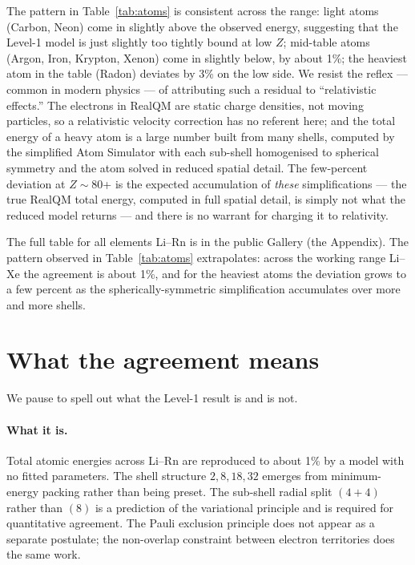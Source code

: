 The pattern in Table~\ref{tab:atoms} is consistent across the range: light atoms (Carbon, Neon) come in slightly above the observed energy, suggesting that the Level-1 model is just slightly too tightly bound at low $Z$; mid-table atoms (Argon, Iron, Krypton, Xenon) come in slightly below, by about 1\%; the heaviest atom in the table (Radon) deviates by 3\% on the low side. We resist the reflex --- common in modern physics --- of attributing such a residual to ``relativistic effects.'' The electrons in RealQM are static charge densities, not moving particles, so a relativistic velocity correction has no referent here; and the total energy of a heavy atom is a large number built from many shells, computed by the simplified Atom Simulator with each sub-shell homogenised to spherical symmetry and the atom solved in reduced spatial detail. The few-percent deviation at $Z \sim 80$+ is the expected accumulation of \emph{these} simplifications --- the true RealQM total energy, computed in full spatial detail, is simply not what the reduced model returns --- and there is no warrant for charging it to relativity.

The full table for all elements Li--Rn is in the public Gallery (the Appendix). The pattern observed in Table~\ref{tab:atoms} extrapolates: across the working range Li--Xe the agreement is about 1\%, and for the heaviest atoms the deviation grows to a few percent as the spherically-symmetric simplification accumulates over more and more shells.

\section{What the agreement means}\label{sec:meaning}

We pause to spell out what the Level-1 result is and is not.

\paragraph{What it is.} Total atomic energies across Li--Rn are reproduced to about 1\% by a model with no fitted parameters. The shell structure $2, 8, 18, 32$ emerges from minimum-energy packing rather than being preset. The sub-shell radial split $(4{+}4)$ rather than $(8)$ is a prediction of the variational principle and is required for quantitative agreement. The Pauli exclusion principle does not appear as a separate postulate; the non-overlap constraint between electron territories does the same work.

